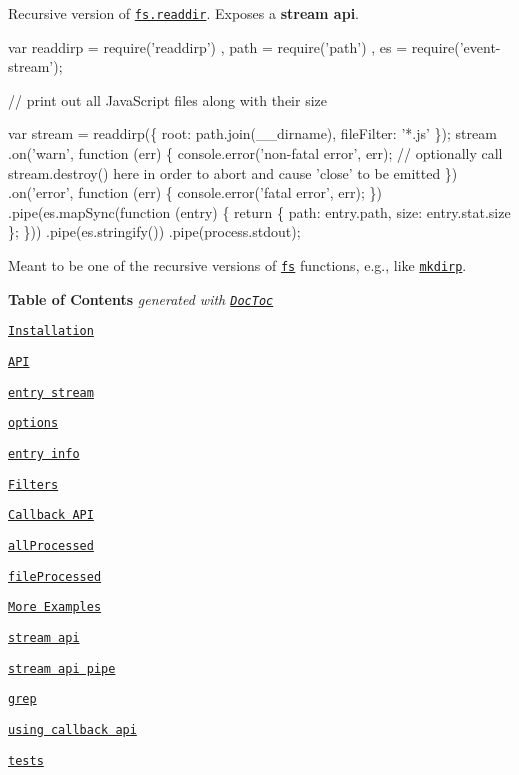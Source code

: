 \href{https://nodei.co/npm/readdirp/}{\tt }

Recursive version of \href{http://nodejs.org/docs/latest/api/fs.html#fs_fs_readdir_path_callback}{\tt fs.\+readdir}. Exposes a {\bfseries stream api}.


\begin{DoxyCode}
var readdirp = require('readdirp')
  , path = require('path')
  , es = require('event-stream');

// print out all JavaScript files along with their size

var stream = readdirp(\{ root: path.join(\_\_dirname), fileFilter: '*.js' \});
stream
  .on('warn', function (err) \{
    console.error('non-fatal error', err);
    // optionally call stream.destroy() here in order to abort and cause 'close' to be emitted
  \})
  .on('error', function (err) \{ console.error('fatal error', err); \})
  .pipe(es.mapSync(function (entry) \{
    return \{ path: entry.path, size: entry.stat.size \};
  \}))
  .pipe(es.stringify())
  .pipe(process.stdout);
\end{DoxyCode}


Meant to be one of the recursive versions of \href{http://nodejs.org/docs/latest/api/fs.html}{\tt fs} functions, e.\+g., like \href{https://github.com/substack/node-mkdirp}{\tt mkdirp}.

{\bfseries Table of Contents} {\itshape generated with \href{http://doctoc.herokuapp.com/}{\tt Doc\+Toc}}


\begin{DoxyItemize}
\item \href{#installation}{\tt Installation}
\item \href{#api}{\tt A\+PI}
\begin{DoxyItemize}
\item \href{#entry-stream}{\tt entry stream}
\item \href{#options}{\tt options}
\item \href{#entry-info}{\tt entry info}
\item \href{#filters}{\tt Filters}
\item \href{#callback-api}{\tt Callback A\+PI}
\begin{DoxyItemize}
\item \href{#allprocessed}{\tt all\+Processed}
\item \href{#fileprocessed}{\tt file\+Processed}
\end{DoxyItemize}
\end{DoxyItemize}
\item \href{#more-examples}{\tt More Examples}
\begin{DoxyItemize}
\item \href{#stream-api}{\tt stream api}
\item \href{#stream-api-pipe}{\tt stream api pipe}
\item \href{#grep}{\tt grep}
\item \href{#using-callback-api}{\tt using callback api}
\item \href{#tests}{\tt tests}
\end{DoxyItemize}
\end{DoxyItemize}

